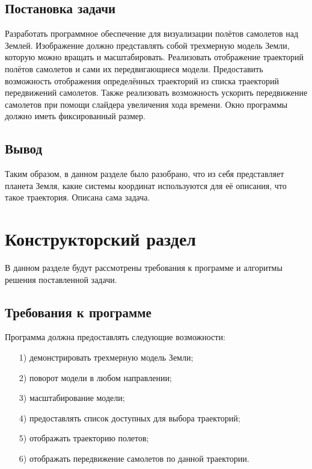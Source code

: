 \documentclass[14pt, a4paper]{extarticle}
\begin{document}
	\subsection{Постановка задачи}
	Разработать программное обеспечение для визуализации полётов самолетов над Землей. Изображение должно представлять собой трехмерную модель Земли, которую можно вращать и масштабировать. Реализовать отображение траекторий полётов самолетов и сами их передвигающиеся модели. Предоставить возможность отображения определённых траекторий из списка траекторий передвижений самолетов. Также реализовать возможность ускорить передвижение самолетов при помощи слайдера увеличения хода времени. Окно программы должно иметь фиксированный размер.
	
	\subsection*{Вывод}
	Таким образом, в данном разделе было разобрано, что из себя представляет планета Земля, какие системы координат используются для её описания, что такое траектория. Описана сама задача.
	
	\clearpage
	\section{Конструкторский раздел}
	В данном разделе будут рассмотрены требования к программе и алгоритмы решения поставленной задачи.
	
	\subsection{Требования к программе}
	Программа должна предоставлять следующие возможности:
	\begin{itemize}
		\item[1)] демонстрировать трехмерную модель Земли;
		\item[2)] поворот модели в любом направлении;
		\item[3)] масштабирование модели;
		\item[4)] предоставлять список доступных для выбора траекторий;
		\item[5)] отображать траекторию полетов;
		\item[6)] отображать передвижение самолетов по данной траектории.
	\end{itemize}
	
\end{document}
